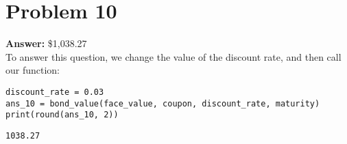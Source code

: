 \documentclass[11pt]{article}
\begin{document}
\section*{Problem 10}
\label{sec:orge6b70f3}

\textbf{Answer:} \$1,038.27\\

To answer this question, we change the value of the discount rate, and then call
our function:
\begin{verbatim}
discount_rate = 0.03
ans_10 = bond_value(face_value, coupon, discount_rate, maturity)
print(round(ans_10, 2))
\end{verbatim}
\label{problem_10}
\begin{verbatim}
1038.27
\end{verbatim}
\end{document}
